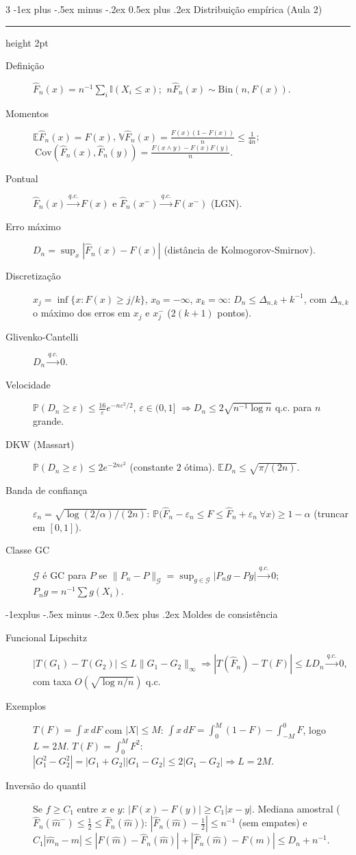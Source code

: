 \documentclass[10pt,landscape]{article}
\makeatletter
\newcommand{\E}{\mathbb{E}}
\newcommand{\V}{\mathbb{V}}
\renewcommand{\P}{\mathbb{P}}
\newcommand{\I}{\mathbb{I}}
\newcommand{\cov}{\textrm{Cov}}
\newcommand{\Fn}{\hat{F}_n}
\newcommand{\qc}{\xrightarrow{q.c.}}
\renewcommand{\section}{\@startsection{section}{1}{0mm}%
                                {-1ex plus -.5ex minus -.2ex}%
                                {0.5ex plus .2ex}%
                                {\normalfont\small\bfseries}}
\renewcommand{\subsection}{\@startsection{subsection}{2}{0mm}%
                                {-1explus -.5ex minus -.2ex}%
                                {0.5ex plus .2ex}%
                                {\normalfont\footnotesize\bfseries}}
\newcommand{\secrule}{\smallskip \hrule height 2pt \smallskip}
\makeatother
\begin{document}
\begin{multicols}{3}
\section{Distribuição empírica (Aula 2)}\secrule
\begin{description}
  \item[Definição] $\Fn(x)=n^{-1}\sum_i\I(X_i\le x)$; $\ n\Fn(x)\sim\textrm{Bin}(n,F(x))$.
  \item[Momentos] $\E\Fn(x)=F(x)$, $\V\Fn(x)=\frac{F(x)(1-F(x))}{n}\le\frac1{4n}$; $\ \cov(\Fn(x),\Fn(y))=\frac{F(x\wedge y)-F(x)F(y)}{n}$.
  \item[Pontual] $\Fn(x)\qc F(x)$ e $\Fn(x^-)\qc F(x^-)$ (LGN).
  \item[Erro máximo] $D_n=\sup_x|\Fn(x)-F(x)|$ (distância de Kolmogorov-Smirnov).
  \item[Discretização] $x_j=\inf\{x:F(x)\ge j/k\}$, $x_0=-\infty$, $x_k=\infty$: $D_n\le\Delta_{n,k}+k^{-1}$, com $\Delta_{n,k}$ o máximo dos erros em $x_j$ e $x_j^-$ ($2(k+1)$ pontos).
  \item[Glivenko-Cantelli] $D_n\qc0$.
  \item[Velocidade] $\P(D_n\ge\varepsilon)\le\frac{16}{\varepsilon}e^{-n\varepsilon^2/2}$, $\varepsilon\in(0,1]$ $\Rightarrow D_n\le2\sqrt{n^{-1}\log n}$ q.c. para $n$ grande.
  \item[DKW (Massart)] $\P(D_n\ge\varepsilon)\le2e^{-2n\varepsilon^2}$ (constante $2$ ótima). $\E D_n\le\sqrt{\pi/(2n)}$.
  \item[Banda de confiança] $\varepsilon_n=\sqrt{\log(2/\alpha)/(2n)}$: $\P\big(\Fn-\varepsilon_n\le F\le\Fn+\varepsilon_n\ \forall x\big)\ge1-\alpha$ (truncar em $[0,1]$).
  \item[Classe GC] $\mathcal G$ é GC para $P$ se $\|P_n-P\|_{\mathcal G}=\sup_{g\in\mathcal G}|P_ng-Pg|\qc0$; $P_ng=n^{-1}\sum g(X_i)$.
\end{description}

\subsection{Moldes de consistência}
\begin{description}
  \item[Funcional Lipschitz] $|T(G_1)-T(G_2)|\le L\|G_1-G_2\|_\infty\Rightarrow|T(\Fn)-T(F)|\le LD_n\qc0$, com taxa $O(\sqrt{\log n/n})$ q.c.
  \item[Exemplos] $T(F)=\int x\,dF$ com $|X|\le M$: $\int x\,dF=\int_0^M(1-F)-\int_{-M}^0F$, logo $L=2M$. $T(F)=\int_0^MF^2$: $|G_1^2-G_2^2|=|G_1+G_2||G_1-G_2|\le2|G_1-G_2|\Rightarrow L=2M$.
  \item[Inversão do quantil] Se $f\ge C_1$ entre $x$ e $y$: $|F(x)-F(y)|\ge C_1|x-y|$. Mediana amostral ($\Fn(\hat m^-)\le\frac12\le\Fn(\hat m)$): $|\Fn(\hat m)-\tfrac12|\le n^{-1}$ (sem empates) e
  $C_1|\hat m_n-m|\le|F(\hat m)-\Fn(\hat m)|+|\Fn(\hat m)-F(m)|\le D_n+n^{-1}$.
\end{description}


\end{multicols}
\end{document}
